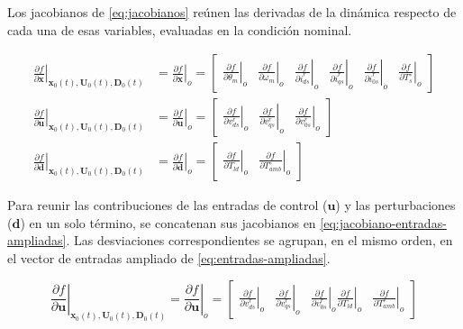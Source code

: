 \documentclass[blue,fullpaper]{ludusofficial}  %
\begin{document}
Los jacobianos de \eqref{eq:jacobianos} reúnen las derivadas de la dinámica respecto de cada una de esas variables, evaluadas en la condición nominal.

\begin{equation}
\label{eq:jacobianos}
\begin{aligned}
\left. \frac{\partial f}{\partial \mathbf{x}} \right|_{\mathbf{x}_0(t), \mathbf{U}_0(t), \mathbf{D}_0(t)}  & = \left. \frac{\partial f}{\partial \mathbf{x}} \right|_o = \begin{bmatrix} \left. \frac{\partial f}{\partial \theta_m} \right|_o & \left. \frac{\partial f}{\partial \omega_m} \right|_o & \left. \frac{\partial f}{\partial i_{ds}^r} \right|_o &  \left. \frac{\partial f}{\partial i_{qs}^r} \right|_o  & \left. \frac{\partial f}{\partial i_{0s}^r} \right|_o & \left. \frac{\partial f}{\partial T_s^{\circ}} \right|_o \end{bmatrix} \\
\left. \frac{\partial f}{\partial \mathbf{u}} \right|_{\mathbf{x}_0(t), \mathbf{U}_0(t), \mathbf{D}_0(t)}  & = \left. \frac{\partial f}{\partial \mathbf{u}} \right|_o = \begin{bmatrix} \left. \frac{\partial f}{\partial v_{ds}^{r}} \right|_o & \left. \frac{\partial f}{\partial v_{qs}^{r}} \right|_o & \left. \frac{\partial f}{\partial v_{0s}^{r}} \right|_o \end{bmatrix} \\
\left. \frac{\partial f}{\partial \mathbf{d}} \right|_{\mathbf{x}_0(t), \mathbf{U}_0(t), \mathbf{D}_0(t)}  & = \left. \frac{\partial f}{\partial \mathbf{d}} \right|_o = \begin{bmatrix} \left. \frac{\partial f}{\partial T_{ld}} \right|_o & \left. \frac{\partial f}{\partial T_{amb}^{\circ}} \right|_o \end{bmatrix}
\end{aligned}
\end{equation}

Para reunir las contribuciones de las entradas de control (\(\mathbf{u}\)) y las perturbaciones (\(\mathbf{d}\)) en un solo término, se concatenan sus jacobianos en \eqref{eq:jacobiano-entradas-ampliadas}. Las desviaciones correspondientes se agrupan, en el mismo orden, en el vector de entradas ampliado de \eqref{eq:entradas-ampliadas}.

\begin{equation}
\label{eq:jacobiano-entradas-ampliadas}
\left. \frac{\partial f}{\partial \mathbf{u}} \right|_{\mathbf{x}_0(t), \mathbf{U}_0(t), \mathbf{D}_0(t)} = \left. \frac{\partial f}{\partial \mathbf{u}} \right|_o = \begin{bmatrix} \left. \frac{\partial f}{\partial v_{ds}^{r}} \right|_o & \left. \frac{\partial f}{\partial v_{qs}^{r}} \right|_o & \left. \frac{\partial f}{\partial v_{0s}^{r}} \right|_o \left.  \frac{\partial f}{\partial T_{ld}} \right|_o & \left. \frac{\partial f}{\partial T_{amb}^{\circ}} \right|_o \end{bmatrix}
\end{equation}
\end{document}
